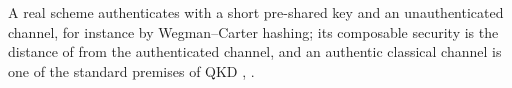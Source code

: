 
A real scheme authenticates with a short pre-shared key and an
unauthenticated channel, for instance by Wegman--Carter hashing; its
composable security is the distance of
\cite[Sec.~VII.A, Eq.~(36)]{portmann2022security} from the authenticated
channel, and an authentic classical channel is one of the standard premises
of QKD \cite[Sec.~IV.A]{portmann2022security},
\cite[Sec.~3]{tupkary2025survey}.

